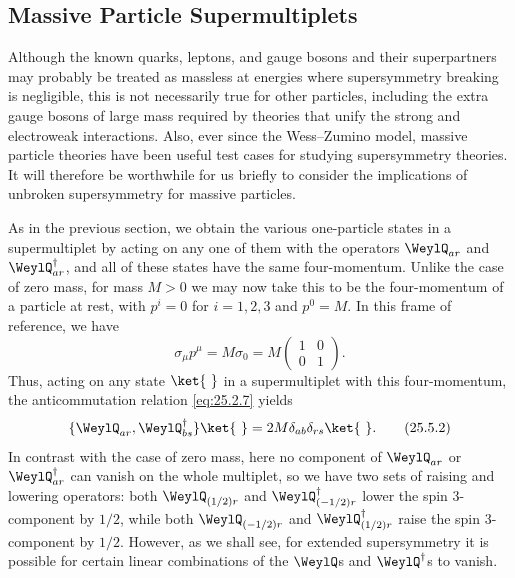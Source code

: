 \subsection{Massive Particle Supermultiplets}

Although the known quarks, leptons, and gauge bosons and their superpartners
may probably be treated as massless at energies where supersymmetry breaking
is negligible, this is not necessarily true for other particles, including
the extra gauge bosons of large mass required by theories that unify the
strong and electroweak interactions. Also, ever since the Wess--Zumino model,
massive particle theories have been useful test cases for studying
supersymmetry theories. It will therefore be worthwhile for us briefly to
consider the implications of unbroken supersymmetry for massive particles.

As in the previous section, we obtain the various one-particle states in a
supermultiplet by acting on any one of them with the operators
$\WeylQ_{ar}$ and $\WeylQ_{ar}^\dagger$, and all of these states have the same
four-momentum. Unlike the case of zero mass, for mass $M>0$ we may now take
this to be the four-momentum of a particle at rest, with $p^i=0$ for
$i=1,2,3$ and $p^0=M$. In this frame of reference, we have
\begin{equation}
 \sigma_\mu p^\mu=M\sigma_0
 =M\begin{pmatrix}1&0\\0&1\end{pmatrix}.
\tag{25.5.1}\label{eq:25.5.1}
\end{equation}
Thus, acting on any state $\ket{\ }$ in a supermultiplet with this
four-momentum, the anticommutation relation \eqref{eq:25.2.7} yields
\begin{equation}
 \{\WeylQ_{ar},\WeylQ_{bs}^\dagger\}\ket{\ }
 =2M\delta_{ab}\delta_{rs}\ket{\ }.
\tag{25.5.2}\label{eq:25.5.2}
\end{equation}
In contrast with the case of zero mass, here no component of $\WeylQ_{ar}$ or
$\WeylQ_{ar}^\dagger$ can vanish on the whole multiplet, so we have two sets
of raising and lowering operators: both $\WeylQ_{(1/2)r}$ and
$\WeylQ_{(-1/2)r}^\dagger$ lower the spin 3-component by $1/2$, while both
$\WeylQ_{(-1/2)r}$ and $\WeylQ_{(1/2)r}^\dagger$ raise the spin 3-component
by $1/2$. However, as we shall see, for extended supersymmetry it is possible
for certain linear combinations of the $\WeylQ$s and $\WeylQ^\dagger$s to
vanish.

